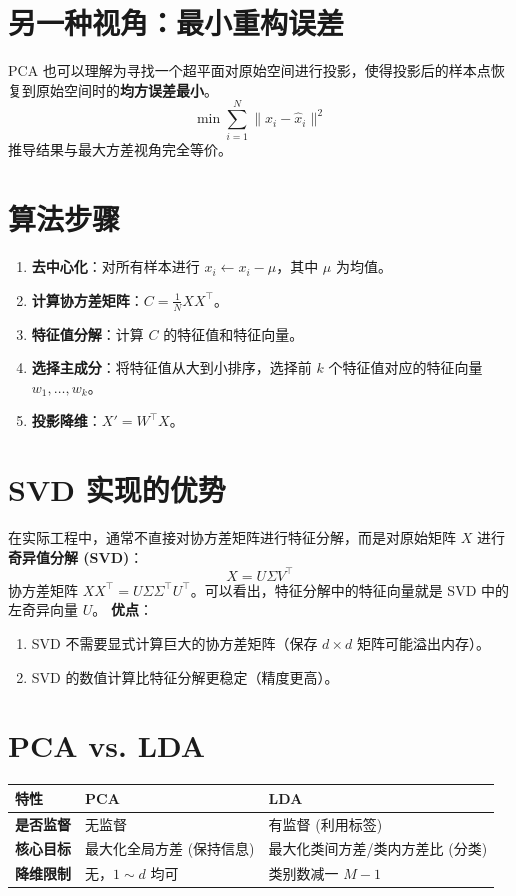 \documentclass[12pt, a4paper]{article}
\begin{document}
\section{另一种视角：最小重构误差}
PCA 也可以理解为寻找一个超平面对原始空间进行投影，使得投影后的样本点恢复到原始空间时的\textbf{均方误差最小}。
$$ \min \sum_{i=1}^N \|x_i - \hat{x}_i\|^2 $$
推导结果与最大方差视角完全等价。

\section{算法步骤}
\begin{enumerate}
    \item \textbf{去中心化}：对所有样本进行 $x_i \leftarrow x_i - \mu$，其中 $\mu$ 为均值。
    \item \textbf{计算协方差矩阵}：$C = \frac{1}{N} XX^\top$。
    \item \textbf{特征值分解}：计算 $C$ 的特征值和特征向量。
    \item \textbf{选择主成分}：将特征值从大到小排序，选择前 $k$ 个特征值对应的特征向量 $w_1, \dots, w_k$。
    \item \textbf{投影降维}：$X' = W^\top X$。
\end{enumerate}

\section{SVD 实现的优势}
在实际工程中，通常不直接对协方差矩阵进行特征分解，而是对原始矩阵 $X$ 进行\textbf{奇异值分解 (SVD)}：
$$ X = U \Sigma V^\top $$
协方差矩阵 $XX^\top = U \Sigma \Sigma^\top U^\top$。可以看出，特征分解中的特征向量就是 SVD 中的左奇异向量 $U$。
\textbf{优点}：
\begin{enumerate}
    \item SVD 不需要显式计算巨大的协方差矩阵（保存 $d \times d$ 矩阵可能溢出内存）。
    \item SVD 的数值计算比特征分解更稳定（精度更高）。
\end{enumerate}

\section{PCA vs. LDA}
\begin{table}[h]
\centering
\begin{tabularx}{\textwidth}{|l|X|X|}
\hline
\textbf{特性} & \textbf{PCA} & \textbf{LDA} \\
\hline
\textbf{是否监督} & 无监督 & 有监督 (利用标签) \\
\hline
\textbf{核心目标} & 最大化全局方差 (保持信息) & 最大化类间方差/类内方差比 (分类) \\
\hline
\textbf{降维限制} & 无，$1 \sim d$ 均可 & 类别数减一 $M-1$ \\
\hline
\end{tabularx}
\end{table}
\end{document}
